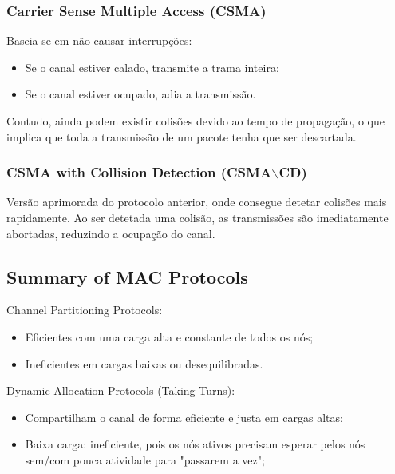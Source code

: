 \documentclass[12pt]{article}
\begin{document}
\subsubsection*{Carrier Sense Multiple Access (CSMA)}

Baseia-se em não causar interrupções:

\begin{itemize}
    \item Se o canal estiver calado, transmite a trama inteira;
    \item Se o canal estiver ocupado, adia a transmissão.
\end{itemize}

Contudo, ainda podem existir colisões devido ao tempo de propagação, o que implica que toda a transmissão de um pacote tenha que ser descartada.

\subsubsection*{CSMA with Collision Detection (CSMA$\backslash$CD)}

Versão aprimorada do protocolo anterior, onde consegue detetar colisões mais rapidamente. Ao ser detetada uma colisão, as transmissões são imediatamente abortadas, reduzindo a ocupação do canal.

\subsection{Summary of MAC Protocols}

Channel Partitioning Protocols:

\begin{itemize}[topsep=0pt, itemsep=0pt]
    \item Eficientes com uma carga alta e constante de todos os nós;
    \item Ineficientes em cargas baixas ou desequilibradas.
\end{itemize}

Dynamic Allocation Protocols (Taking-Turns):

\begin{itemize}[topsep=0pt, itemsep=0pt]
    \item Compartilham o canal de forma eficiente e justa em cargas altas;
    \item Baixa carga: ineficiente, pois os nós ativos precisam esperar pelos nós sem/com pouca atividade para "passarem a vez";
\end{itemize}
\end{document}
